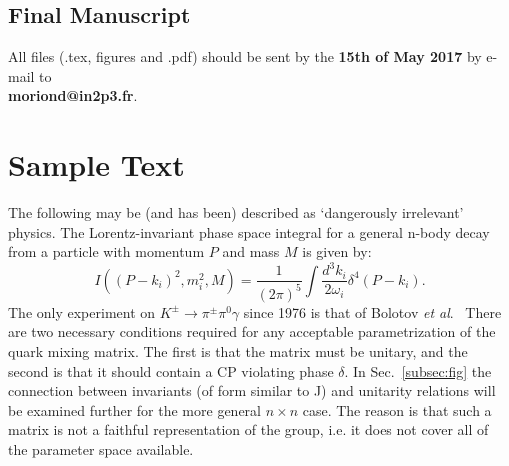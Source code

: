 \documentclass{moriond}
\def\ra{\rightarrow}
\begin{document}
\subsection{Final Manuscript}\label{subsec:final}

All files (.tex, figures and .pdf) should be sent by the {\bf 15th of May 2017}
by e-mail 
to \\
{\bf moriond@in2p3.fr}.\\

\section{Sample Text }

The following may be (and has been) described as `dangerously irrelevant'
physics. The Lorentz-invariant phase space integral for
a general n-body decay from a particle with momentum $P$
and mass $M$ is given by:
\begin{equation}
I((P - k_i)^2, m^2_i, M) = \frac{1}{(2 \pi)^5}\!
\int\!\frac{d^3 k_i}{2 \omega_i} \! \delta^4(P - k_i).
\label{eq:murnf}
\end{equation}
The only experiment on $K^{\pm} \ra \pi^{\pm} \pi^0 \gamma$ since 1976
is that of Bolotov {\it et al}.~
        There are two
necessary conditions required for any acceptable
parametrization of the
quark mixing matrix. The first is that the matrix must be unitary, and the
second is that it should contain a CP violating phase $\delta$.
 In Sec.~\ref{subsec:fig} the connection between invariants (of
form similar to J) and unitarity relations
will be examined further for the more general $ n \times n $ case.
The reason is that such a matrix is not a faithful representation of the group,
i.e. it does not cover all of the parameter space available.
\end{document}
